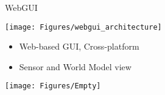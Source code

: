\documentclass[12pt,a4paper]{article}
\newcommand{\emptylogo}{\texttt{[image: Figures/Empty]}}
\begin{document}
\begin{slidetop}
\begin{multicols}{2}
\vspace{-0.83cm} %

\begin{bclogo}[couleur = white, arrondi = 0.25, couleurBord = tuedarkblue , barre = none, logo=\emptylogo]{\textcolor{tuedarkblue}{WebGUI}}
\medskip %
\begin{minipage}[T]{\textwidth}
    \begin{center}
        \texttt{[image: Figures/webgui\_architecture]}
    \end{center}
\end{minipage}
\begin{itemize}[itemsep = 0pt, parsep = 0pt, leftmargin=15pt]
	\item Web-based GUI, Cross-platform
	\item Sensor and World Model view
\end{itemize}
\end{bclogo}

\texttt{[image: Figures/Empty]}
\end{multicols}
\end{slidetop}
\end{document}
